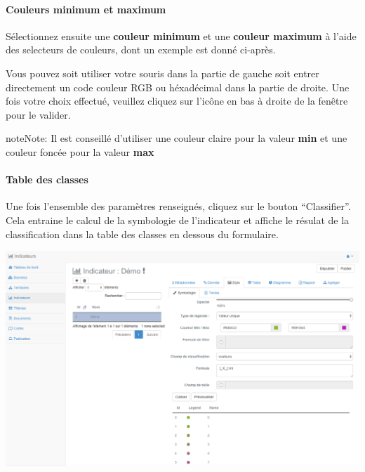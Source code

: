 \documentclass[letterpaper,10pt,french]{sphinxmanual}
\begin{document}
\paragraph{Couleurs minimum et maximum}

Sélectionnez ensuite une \textbf{couleur minimum} et une \textbf{couleur maximum} à l'aide des selecteurs de couleurs, dont un exemple est donné ci-après.


Vous pouvez soit utiliser votre souris dans la partie de gauche soit entrer directement un code couleur RGB ou héxadécimal dans la partie de droite. Une fois votre choix effectué, veuillez cliquez sur l'icône en bas à droite de la fenêtre pour le valider.

\begin{notice}{note}{Note:}
Il est conseillé d'utiliser une couleur claire pour la valeur \textbf{min} et une couleur foncée pour la valeur \textbf{max}
\end{notice}
\paragraph{Table des classes}

Une fois l'ensemble des paramètres renseignés, cliquez sur le bouton ``Classifier''. Cela entraine le calcul de la symbologie de l'indicateur et affiche le résulat de la classification dans la table des classes en dessous du formulaire.

\includegraphics[width=1.000\linewidth]{indicator-classes-table.png}
\end{document}
